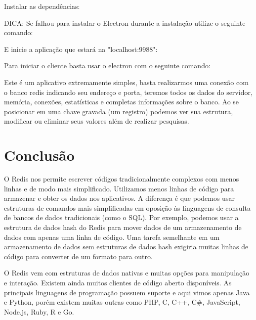 \documentclass[a4paper,11pt]{article}
\begin{document}
Instalar as dependências: \\

DICA: Se falhou para instalar o Electron durante a instalação utilize o seguinte comando: \\

E inicie a aplicação que estará na "localhost:9988": \\

Para iniciar o cliente basta usar o electron com o seguinte comando: \\

Este é um aplicativo extremamente simples, basta realizarmos uma conexão com o banco redis indicando seu endereço e porta, teremos todos os dados do servidor, memória, conexões, estatísticas e completas informações sobre o banco. Ao se posicionar em uma chave gravada (um registro) podemos ver sua estrutura, modificar ou eliminar seus valores além de realizar pesquisas.




\section{Conclusão}
O Redis nos permite escrever códigos tradicionalmente complexos com menos linhas e de modo mais simplificado. Utilizamos menos linhas de código para armazenar e obter os dados nos aplicativos. A diferença é que podemos usar estruturas de comandos mais simplificadas em oposição às linguagens de consulta de bancos de dados tradicionais (como o SQL). Por exemplo, podemos usar a estrutura de dados hash do Redis para mover dados de um armazenamento de dados com apenas uma linha de código. Uma tarefa semelhante em um armazenamento de dados sem estruturas de dados hash exigiria muitas linhas de código para converter de um formato para outro. 

O Redis vem com estruturas de dados nativas e muitas opções para manipulação e interação. Existem ainda muitos clientes de código aberto disponíveis. As principais linguagens de programação possuem suporte e aqui vimos apenas Java e Python, porém existem muitas outras como PHP, C, C++, C\#, JavaScript, Node.js, Ruby, R e Go. 


\end{document}
